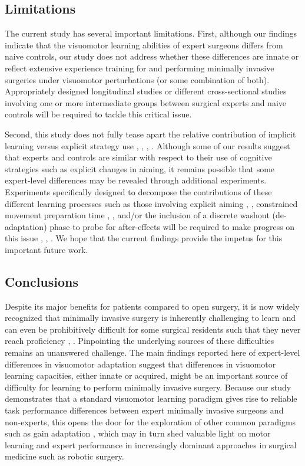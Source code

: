 \documentclass[jou, 11pt, longtable, floatsintext, notab]{apa6}
\begin{document}
\subsection{Limitations}
The current study has several important limitations. First,
although our findings indicate that the visuomotor learning
abilities of expert surgeons differs from naive controls,
our study does not address whether these differences are
innate or reflect extensive experience training for and
performing minimally invasive surgeries under visuomotor
perturbations (or some combination of both). Appropriately
designed longitudinal studies or different cross-sectional
studies involving one or more intermediate groups between
surgical experts and naive controls will be required to
tackle this critical issue.

Second, this study does not fully tease apart the relative
contribution of implicit learning versus explicit strategy
use \cite{smith_interacting_2006},
\cite{mcdougle_taking_2016}, \cite{mazzoni_implicit_2006},
\cite{taylor_explicit_2014}. Although some of our results
suggest that experts and controls are similar with respect
to their use of cognitive strategies such as explicit
changes in aiming, it remains possible that some
expert-level differences may be revealed through additional
experiments. Experiments specifically designed to decompose
the contributions of these different learning processes such
as those involving explicit aiming
\cite{taylor_explicit_2014}, \cite{bond_flexible_2015},
constrained movement preparation time
\cite{haith_influence_2015}, \cite{leow_estimating_2017},
and/or the inclusion of a discrete washout (de-adaptation)
phase to probe for after-effects
\cite{smith_interacting_2006} will be required to make
progress on this issue \cite{mcdougle_taking_2016},
\cite{mazzoni_implicit_2006}, \cite{taylor_explicit_2014}.
We hope that the current findings provide the impetus for
this important future work.

\subsection{Conclusions}
Despite its major benefits for patients compared to open
surgery, it is now widely recognized that minimally invasive
surgery is inherently challenging to learn and can even be
prohibitively difficult for some surgical residents such
that they never reach proficiency
\cite{green_action_2003}, \cite{buckley_impact_2014}.
Pinpointing the underlying sources of these difficulties
remains an unanswered challenge. The main findings reported
here of expert-level differences in visuomotor adaptation
suggest that differences in visuomotor learning capacities,
either innate or acquired, might be an important source of
difficulty for learning to perform minimally invasive
surgery. Because our study demonstrates that a standard
visuomotor learning paradigm gives rise to reliable task
performance differences between expert minimally invasive
surgeons and non-experts, this opens the door for the
exploration of other common paradigms such as gain
adaptation \cite{krakauer_learning_2000}, which may in turn
shed valuable light on motor learning and expert performance
in increasingly dominant approaches in surgical medicine
such as robotic surgery.
\end{document}
